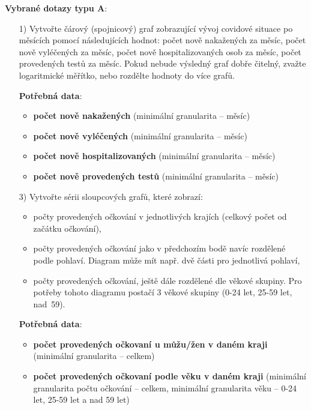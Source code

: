 \documentclass[12pt]{article}
\begin{document}
\textbf{Vybrané dotazy typu A}:
\begin{itemize}
    \item[1)] Vytvořte čárový (spojnicový) graf zobrazující vývoj covidové situace po měsících pomocí následujících hodnot: počet nově nakažených za měsíc, počet nově vyléčených za měsíc, počet nově hospitalizovaných osob za měsíc, počet provedených testů za měsíc. Pokud nebude výsledný graf dobře čitelný, zvažte logaritmické měřítko, nebo rozdělte hodnoty do více grafů.
    
    \item[] \textbf{Potřebná data}:
    \begin{itemize}
        \item \textbf{počet nově nakažených} (minimální granularita -- měsíc)
        \item \textbf{počet nově vyléčených} (minimální granularita -- měsíc)
        \item \textbf{počet nově hospitalizovaných} (minimální granularita -- měsíc)
        \item \textbf{počet nově provedených testů} (minimální granularita -- měsíc)
    \end{itemize}
    
    \hspace{1cm}
    
    \item[3)] Vytvořte sérii sloupcových grafů, které zobrazí:
    \begin{itemize}
        \item počty provedených očkování v jednotlivých krajích (celkový počet od začátku očkování),
        \item počty provedených očkování jako v předchozím bodě navíc rozdělené podle pohlaví. Diagram může mít např. dvě části pro jednotlivá pohlaví,
        \item počty provedených očkování, ještě dále rozdělené dle věkové skupiny. Pro potřeby tohoto diagramu postačí 3 věkové skupiny (0-24 let, 25-59 let, nad~59).
    \end{itemize}

    \item[] \textbf{Potřebná data}:
    \begin{itemize}
        \item \textbf{počet provedených očkovaní u můžu/žen v daném kraji} (minimální granularita -- celkem)
        \item \textbf{počet provedených očkovaní podle věku v daném kraji} (minimální granularita počtu očkování -- celkem, minimální granularita věku -- 0-24 let, 25-59 let a nad 59 let)
    \end{itemize}
\end{itemize}
\end{document}
